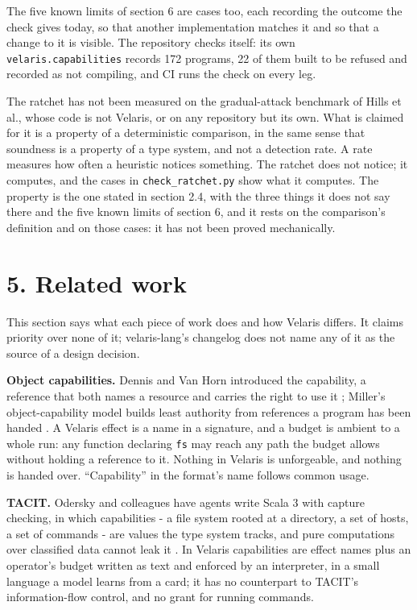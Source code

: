 \documentclass[
]{article}
\newcounter{none} %
\begin{document}
The five known limits of section 6 are cases too, each recording the
outcome the check gives today, so that another implementation matches it
and so that a change to it is visible. The repository checks itself: its
own \texttt{velaris.capabilities} records 172 programs, 22 of them built
to be refused and recorded as not compiling, and CI runs the check on
every leg.

The ratchet has not been measured on the gradual-attack benchmark of
Hills et al., whose code is not Velaris, or on any repository but its
own. What is claimed for it is a property of a deterministic comparison,
in the same sense that soundness is a property of a type system, and not
a detection rate. A rate measures how often a heuristic notices
something. The ratchet does not notice; it computes, and the cases in
\texttt{check\_ratchet.py} show what it computes. The property is the
one stated in section 2.4, with the three things it does not say there
and the five known limits of section 6, and it rests on the comparison's
definition and on those cases: it has not been proved mechanically.

\section{5. Related work}\label{related-work}

This section says what each piece of work does and how Velaris differs.
It claims priority over none of it; velaris-lang's changelog does not
name any of it as the source of a design decision.

\textbf{Object capabilities.} Dennis and Van Horn introduced the
capability, a reference that both names a resource and carries the right
to use it \citep{dennis1966semantics}; Miller's object-capability model
builds least authority from references a program has been handed
\citep{miller2006robust}. A Velaris effect is a name in a signature, and
a budget is ambient to a whole run: any function declaring \texttt{fs}
may reach any path the budget allows without holding a reference to it.
Nothing in Velaris is unforgeable, and nothing is handed over.
``Capability'' in the format's name follows common usage.

\textbf{TACIT.} Odersky and colleagues have agents write Scala 3 with
capture checking, in which capabilities - a file system rooted at a
directory, a set of hosts, a set of commands - are values the type
system tracks, and pure computations over classified data cannot leak it
\citep{odersky2026tacit}. In Velaris capabilities are effect names plus
an operator's budget written as text and enforced by an interpreter, in
a small language a model learns from a card; it has no counterpart to
TACIT's information-flow control, and no grant for running commands.
\end{document}
